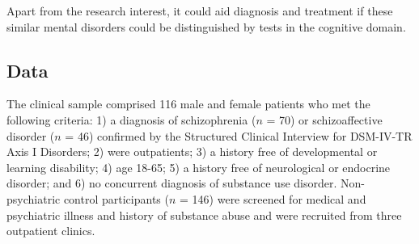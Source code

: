\documentclass[
  letterpaper,
  10pt,
  krantz2]{krantz}
\makeatletter
\newenvironment{Shaded}{\begin{snugshade}}{\end{snugshade}}
\newcommand{\AttributeTok}[1]{\textcolor[rgb]{0.40,0.45,0.13}{#1}}
\newcommand{\CommentTok}[1]{\textcolor[rgb]{0.37,0.37,0.37}{#1}}
\newcommand{\FunctionTok}[1]{\textcolor[rgb]{0.28,0.35,0.67}{#1}}
\newcommand{\NormalTok}[1]{\textcolor[rgb]{0.00,0.23,0.31}{#1}}
\newcommand{\StringTok}[1]{\textcolor[rgb]{0.13,0.47,0.30}{#1}}
\newenvironment{kframe}{%
  \medskip{}
  \setlength{\fboxsep}{.8em}
  \def\at@end@of@kframe{}%
  \ifinner\ifhmode%
  \def\at@end@of@kframe{\end{minipage}}%
  \begin{minipage}{\columnwidth}%
  \fi\fi%
  \def\FrameCommand##1{\hskip\@totalleftmargin \hskip-\fboxsep
  \colorbox{shadecolor}{##1}\hskip-\fboxsep
      \hskip-\linewidth \hskip-\@totalleftmargin \hskip\columnwidth}%
  \MakeFramed {\advance\hsize-\width
    \@totalleftmargin\z@ \linewidth\hsize
    \@setminipage}}%
{\par\unskip\endMakeFramed%
  \at@end@of@kframe}
\renewenvironment{Shaded}{\begin{kframe}}{\end{kframe}}
\makeatother
\begin{document}
Apart from the research interest, it could aid diagnosis and treatment
if these similar mental disorders could be distinguished by tests in the
cognitive domain.

\subsection{Data}\label{data}

The clinical sample comprised 116 male and female patients who met the
following criteria: 1) a diagnosis of schizophrenia (\(n\) = 70) or
schizoaffective disorder (\(n\) = 46) confirmed by the Structured
Clinical Interview for DSM-IV-TR Axis I Disorders; 2) were outpatients;
3) a history free of developmental or learning disability; 4) age 18-65;
5) a history free of neurological or endocrine disorder; and 6) no
concurrent diagnosis of substance use disorder. Non-psychiatric control
participants (\(n\) = 146) were screened for medical and psychiatric
illness and history of substance abuse and were recruited from three
outpatient clinics.

\begin{Shaded}
\end{Shaded}
\end{document}
